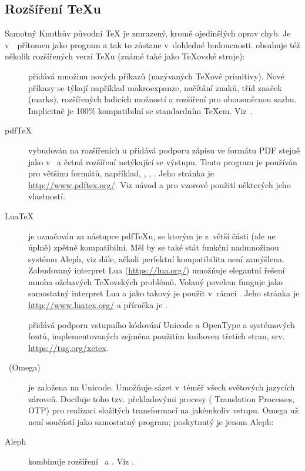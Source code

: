\documentclass[\classoptions,slovak,english,czech]{\classname}
\begin{document}
\subsection{Rozšíření \protect\TeX{}u}
\label{sec:tex.extensions}

Samotný Knuthův původní \TeX{} je zmrazený, kromě ojedinělých oprav chyb.
Je v~\TL\ přítomen jako program  a tak to zůstane
v~dohledné budoucnosti. \TL{} obsahuje též několik rozšířených verzí 
\TeX{}u (známé také jako \TeX{}ovské stroje):

\begin{description}

\item [\eTeX] přidává množinu nových
příkazů (nazývaných \TeX{}ové primitivy).
\label{text:etex}
Nové příkazy se týkají například makroexpanze, načítání znaků,
tříd značek (marks), rozšířených ladicích možností
a rozšíření \TeXXeT{} pro obousměrnou sazbu. Implicitně
je \eTeX{} 100\% kompatibilní se standardním \TeX{}em.
Viz~. 

\item [pdf\TeX] vybudován na rozšířeních \eTeX{}u přidává podporu 
zápisu ve formátu PDF stejně jako v~\dvi{} a 
četná rozšíření netýkající se výstupu. 
Tento program je používán pro většinu formátů, 
například, , ,
. Jeho stránka je \url{http://www.pdftex.org/}. Viz 
návod 
a 
pro vzorové použití některých jeho vlastností.  

\item [Lua\TeX] je označován za nástupce pdf\TeX{}u, se kterým  
je z~větší části (ale ne úplně) zpětně kompatibilní. 
Měl by se také stát funkční nadmnožinou systému %
Aleph, viz dále, ačkoli perfektní kompatibilita není zamýšlena. 
Zabudovaný interpret Lua (\url{https://lua.org/}) 
umožňuje elegantní řešení mnoha ožehavých 
\TeX ovských problémů. Volaný povelem  funguje 
jako samostatný interpret Lua a jako takový je použit
v~rámci \TL. Jeho stránka je \url{http://www.luatex.org/} a příručka je 
.

\item [\XeTeX] přidává podporu vstupního kódování
Unicode a OpenType a systémových fontů, implementovaných
zejména použitím knihoven třetích stran, srv. \url{https://tug.org/xetex}.

\item [\OMEGA\ (Omega)] je založena na Unicode.  
Umožňuje sázet v~téměř všech světových jazycích zároveň.
Dociluje toho tzv. překladovými procesy (\OMEGA{} Translation
Processes, OTP) pro realizaci složitých transformací na jakémkoliv vstupu. 
Omega už není součástí \TL{} jako samostatný program;
poskytnutý je jenom Aleph:

\item [Aleph] kombinuje rozšíření \OMEGA\ a \eTeX.  
Viz .
\end{description}
\end{document}
